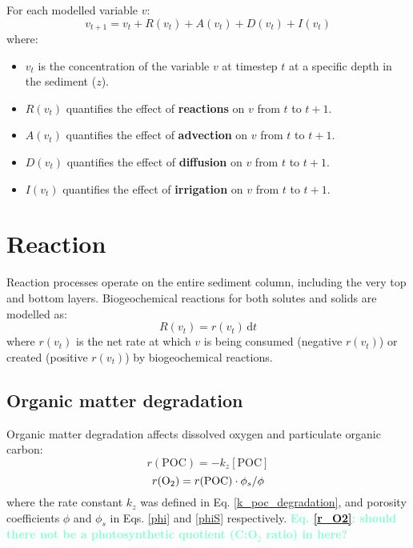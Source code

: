 \documentclass[a4paper]{article}
\newcommand{\D}[1]{\mathrm{d}#1}
\newcommand{\wtf}[1]{\textcolor{Aquamarine}{\textbf{#1}}}
\begin{document}
For each modelled variable $v$:
\begin{equation}
v_{t+1} = v_t + R(v_t) + A(v_t) + D(v_t) + I(v_t)
\end{equation}
where:
\begin{itemize}
  \item $v_t$ is the concentration of the variable $v$ at timestep $t$ at a specific depth in the sediment ($z$).
  \item $R(v_t)$ quantifies the effect of \textbf{reactions} on $v$ from $t$ to $t+1$.
  \item $A(v_t)$ quantifies the effect of \textbf{advection} on $v$ from $t$ to $t+1$.
  \item $D(v_t)$ quantifies the effect of \textbf{diffusion} on $v$ from $t$ to $t+1$.
  \item $I(v_t)$ quantifies the effect of \textbf{irrigation} on $v$ from $t$ to $t+1$.
\end{itemize}

\section{Reaction}

Reaction processes operate on the entire sediment column, including the very top and bottom layers. Biogeochemical reactions for both solutes and solids are modelled as:
\begin{equation}
R(v_t) = r(v_t) \, \D{t}
\end{equation}
where $r(v_t)$ is the net rate at which $v$ is being consumed (negative $r(v_t)$) or created (positive $r(v_t)$) by biogeochemical reactions.

\subsection{Organic matter degradation}

Organic matter degradation affects dissolved oxygen and particulate organic carbon:
\begin{equation}
r(\mathrm{POC}) = -k_z [\mathrm{POC}]
\end{equation}
\begin{equation}\label{r_O2}
r(\ce{O2}) = r(\mathrm{POC}) \cdot \phi_s / \phi
\end{equation}
where the rate constant $k_z$ was defined in Eq. \eqref{k_poc_degradation}, and porosity coefficients $\phi$ and $\phi_s$ in Eqs. \eqref{phi} and \eqref{phiS} respectively. \wtf{Eq. \eqref{r_O2}: should there not be a photosynthetic quotient (C:O$_2$ ratio) in here?}
\end{document}
